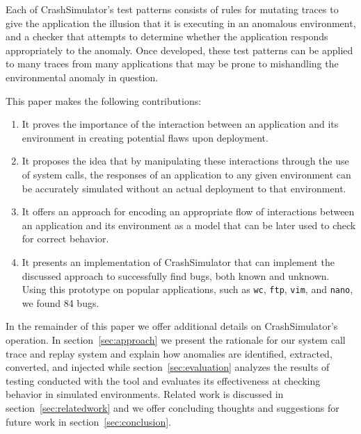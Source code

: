 Each of CrashSimulator's test patterns consists of rules for
mutating traces to give the application the illusion that it is
executing in an anomalous environment, and a checker that attempts to
determine whether the application responds appropriately to the
anomaly.  Once developed, these test patterns can be applied to many
traces from many applications that may be prone to mishandling the
environmental anomaly in question.


This paper makes the following contributions:

\begin{enumerate}
\item{It proves the importance of the interaction between an application and
    its environment in creating potential flaws upon deployment.}
\item{It proposes the idea that by manipulating these interactions through
    the use of system calls, the responses of an application to any given
    environment can be accurately simulated without an actual deployment to
    that environment.}
\item{It offers an approach for encoding an appropriate flow of
    interactions between an application and its environment as a model that
    can be later used to check for correct behavior.}
\item{It presents an implementation of CrashSimulator that can implement the
    discussed approach to successfully find bugs, both known and unknown. 
    Using this prototype on popular applications, such as {\tt wc}, {\tt ftp}, 
    {\tt vim}, and {\tt nano}, we found 84 bugs.}
\end{enumerate}

In the remainder of this paper we
offer additional details on CrashSimulator's operation.
In section~\ref{sec:approach} we present the rationale for our system call trace
and replay system and explain how anomalies are identified, extracted,
converted, and injected while section~\ref{sec:evaluation} analyzes the results
of testing conducted with the tool and evaluates its effectiveness at checking
behavior in simulated environments.  Related work is discussed in
section~\ref{sec:relatedwork} and we offer concluding thoughts and suggestions
for future work in section~\ref{sec:conclusion}.


